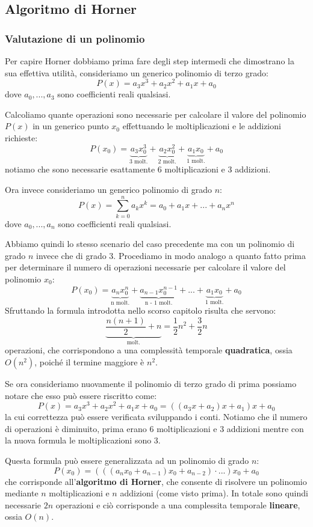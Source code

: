 \documentclass[../main.tex]{subfiles}
\begin{document}
\subsection{Algoritmo di Horner}
\subsubsection{Valutazione di un polinomio}
Per capire Horner dobbiamo prima fare degli step intermedi che dimostrano la sua effettiva utilità, consideriamo un generico polinomio di terzo grado:
$$
    P(x) = a_3x^3 + a_2x^2 + a_1x + a_0
$$
dove $a_0, ..., a_3$ sono coefficienti reali qualsiasi.

Calcoliamo quante operazioni sono necessarie per calcolare il valore del polinomio $P(x)$ in un generico punto $x_0$ effettuando le moltiplicazioni e le addizioni richieste:
$$
    P(x_0) = \underbrace{a_3x_0^3}_{\text{3 molt.}} + \underbrace{a_2x_0^2}_{\text{2 molt.}} + \underbrace{a_1x_0}_{\text{1 molt.}} + a_0
$$
notiamo che sono necessarie esattamente 6 moltiplicazioni e 3 addizioni.

Ora invece consideriamo un generico polinomio di grado $n$:
$$
    P(x) = \sum_{k=0}^{n} a_kx^k = a_0 + a_1x + ... + a_nx^n
$$
dove $a_0, ..., a_n$ sono coefficienti reali qualsiasi.

Abbiamo quindi lo stesso scenario del caso precedente ma con un polinomio di grado $n$ invece che di grado $3$. Procediamo in modo analogo a quanto fatto prima per determinare il numero di operazioni necessarie per calcolare il valore del polinomio $x_0$:
$$
    P(x_0) = \underbrace{a_nx_0^n}_{\text{n molt.}} + \underbrace{a_{n-1}x_0^{n-1}}_{\text{n - 1 molt.}} + ... + \underbrace{a_1x_0}_{\text{1 molt.}} + a_0
$$
Sfruttando la formula introdotta nello scorso capitolo risulta che servono:
$$
    \underbrace{\frac{n(n+1)}{2} + n}_{\text{molt.}} = \frac{1}{2}n^2 + \frac{3}{2}n
$$
operazioni, che corrispondono a una complessità temporale \textbf{quadratica}, ossia $O(n^2)$, poiché il termine maggiore è $n^2$.

Se ora consideriamo nuovamente il polinomio di terzo grado di prima possiamo notare che esso può essere riscritto come:
$$
    P(x) = a_3x^3 + a_2x^2 + a_1x + a_0 = ((a_3x + a_2)x + a_1)x + a_0
$$
la cui correttezza può essere verificata sviluppando i conti. Notiamo che il numero di operazioni è diminuito, prima erano 6 moltiplicazioni e 3 addizioni mentre con la nuova formula le moltiplicazioni sono 3.

Questa formula può essere generalizzata ad un polinomio di grado $n$:
$$
    P(x_0) = (((a_nx_0 + a_{n-1})x_0 + a_{n-2}) \cdot ...)x_0 + a_0
$$
che corrisponde all'\textbf{algoritmo di Horner}, che consente di risolvere un polinomio mediante $n$ moltiplicazioni e $n$ addizioni (come visto prima). In totale sono quindi necessarie $2n$ operazioni e ciò corrisponde a una complessita temporale \textbf{lineare}, ossia $O(n)$.
\end{document}
